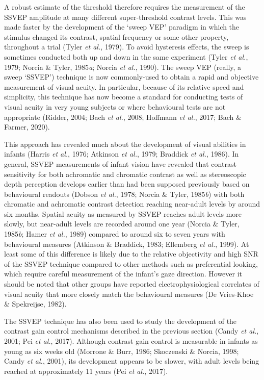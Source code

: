 \documentclass[
  letterpaper,
  DIV=11,
  numbers=noendperiod]{scrartcl}
\begin{document}
A robust estimate of the threshold therefore requires the measurement of
the SSVEP amplitude at many different super-threshold contrast levels.
This was made faster by the development of the `sweep VEP' paradigm in
which the stimulus changed its contrast, spatial frequency or some other
property, throughout a trial (Tyler \emph{et al.}, 1979). To avoid
hysteresis effects, the sweep is sometimes conducted both up and down in
the same experiment (Tyler \emph{et al.}, 1979; Norcia \& Tyler,
1985\emph{a}; Norcia \emph{et al.}, 1990). The sweep VEP (really, a
sweep `SSVEP') technique is now commonly-used to obtain a rapid and
objective measurement of visual acuity. In particular, because of its
relative speed and simplicity, this technique has now become a standard
for conducting tests of visual acuity in very young subjects or where
behavioural tests are not appropriate (Ridder, 2004; Bach \emph{et al.},
2008; Hoffmann \emph{et al.}, 2017; Bach \& Farmer, 2020).

This approach has revealed much about the development of visual
abilities in infants (Harris \emph{et al.}, 1976; Atkinson \emph{et
al.}, 1979; Braddick \emph{et al.}, 1986). In general, SSVEP
measurements of infant vision have revealed that contrast sensitivity
for both achromatic and chromatic contrast as well as stereoscopic depth
perception develops earlier than had been supposed previously based on
behavioural readouts (Dobson \emph{et al.}, 1978; Norcia \& Tyler,
1985\emph{b}) with both chromatic and achromatic contrast detection
reaching near-adult levels by around six months. Spatial acuity as
measured by SSVEP reaches adult levels more slowly, but near-adult
levels are recorded around one year (Norcia \& Tyler, 1985\emph{b};
Hamer \emph{et al.}, 1989) compared to around six to seven years with
behavioural measures (Atkinson \& Braddick, 1983; Ellemberg \emph{et
al.}, 1999). At least some of this difference is likely due to the
relative objectivity and high SNR of the SSVEP technique compared to
other methods such as preferential looking, which require careful
measurement of the infant's gaze direction. However it should be noted
that other groups have reported electrophysiological correlates of
visual acuity that more closely match the behavioural measures (De
Vries-Khoe \& Spekreijse, 1982).

The SSVEP technique has also been used to study the development of the
contrast gain control mechanisms described in the previous section
(Candy \emph{et al.}, 2001; Pei \emph{et al.}, 2017). Although contrast
gain control is measurable in infants as young as six weeks old (Morrone
\& Burr, 1986; Skoczenski \& Norcia, 1998; Candy \emph{et al.}, 2001),
its development appears to be slower, with adult levels being reached at
approximately 11 years (Pei \emph{et al.}, 2017).
\end{document}
